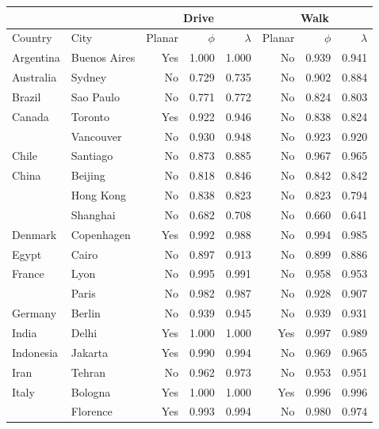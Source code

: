 \begin{tabular}{ l l r r r r r r  }
\toprule
         &               & \multicolumn{3}{|c|}{Drive}         & \multicolumn{3}{c}{Walk}            \\
\midrule
Country      & City          &  Planar  &  $\phi$   &  $\lambda$   &  Planar  &  $\phi$   &  $\lambda$   \\
	\midrule
	Argentina & Buenos Aires &      Yes &  1.000 &  1.000 &       No &  0.939 &  0.941 \\
	Australia & Sydney &       No &  0.729 &  0.735 &       No &  0.902 &  0.884 \\
	Brazil & Sao Paulo &       No &  0.771 &  0.772 &       No &  0.824 &  0.803 \\
	Canada & Toronto &      Yes &  0.922 &  0.946 &       No &  0.838 &  0.824 \\
	& Vancouver &       No &  0.930 &  0.948 &       No &  0.923 &  0.920 \\
	Chile & Santiago &       No &  0.873 &  0.885 &       No &  0.967 &  0.965 \\
	China & Beijing &       No &  0.818 &  0.846 &       No &  0.842 &  0.842 \\
	& Hong Kong &       No &  0.838 &  0.823 &       No &  0.823 &  0.794 \\
	& Shanghai &       No &  0.682 &  0.708 &       No &  0.660 &  0.641 \\
	Denmark & Copenhagen &      Yes &  0.992 &  0.988 &       No &  0.994 &  0.985 \\
	Egypt & Cairo &       No &  0.897 &  0.913 &       No &  0.899 &  0.886 \\
	France & Lyon &       No &  0.995 &  0.991 &       No &  0.958 &  0.953 \\
	& Paris &       No &  0.982 &  0.987 &       No &  0.928 &  0.907 \\
	Germany & Berlin &       No &  0.939 &  0.945 &       No &  0.939 &  0.931 \\
	India & Delhi &      Yes &  1.000 &  1.000 &      Yes &  0.997 &  0.989 \\
	Indonesia & Jakarta &      Yes &  0.990 &  0.994 &       No &  0.969 &  0.965 \\
	Iran & Tehran &       No &  0.962 &  0.973 &       No &  0.953 &  0.951 \\
	Italy & Bologna &      Yes &  1.000 &  1.000 &      Yes &  0.996 &  0.996 \\
	& Florence &      Yes &  0.993 &  0.994 &       No &  0.980 &  0.974 \\

\end{tabular}
